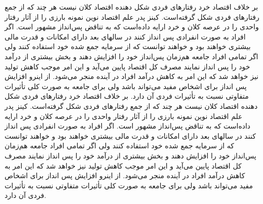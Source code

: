 \documentclass{book}
\begin{document}
بر خلاف اقتصاد خرد رفتارهای فردی شکل دهنده اقتصاد کلان نیست هر چند که از جمع رفتارهای فردی شکل گرفته‌است. کینز پدر علم اقتصاد نوین نمونه بارزی را از آثار رفتار واحدی را در عرصه کلان و خرد ارایه داده‌است که به تناقض پس‌انداز مشهور است. اگر افراد به صورت انفرادی پس انداز کنند در سالهای بعد دارای امکانات و قدرت مالی بیشتری خواهند بود و خواهند توانست که از سرمایه جمع شده خود استفاده کنند ولی اگر تمامی افراد جامعه هم‌زمان پس‌انداز خود را افزایش دهند و بخش بیشتری از درآمد خود را پس انداز نمایند مصرف کل اقتصاد پایین می‌آید و این امر موجب کاهش تولید نیز خواهد شد که این امر به کاهش درآمد افراد در آینده منجر می‌شود. از اینرو افزایش پس انداز برای اشخاص مفید می‌تواند باشد ولی برای جامعه به صورت کلی تأثیرات متفاوتی نسبت به تأثیرات فردی آن دارد.
\newpage
بر خلاف اقتصاد خرد رفتارهای فردی شکل دهنده اقتصاد کلان نیست هر چند که از جمع رفتارهای فردی شکل گرفته‌است. کینز پدر علم اقتصاد نوین نمونه بارزی را از آثار رفتار واحدی را در عرصه کلان و خرد ارایه داده‌است که به تناقض پس‌انداز مشهور است. اگر افراد به صورت انفرادی پس انداز کنند در سالهای بعد دارای امکانات و قدرت مالی بیشتری خواهند بود و خواهند توانست که از سرمایه جمع شده خود استفاده کنند ولی اگر تمامی افراد جامعه هم‌زمان پس‌انداز خود را افزایش دهند و بخش بیشتری از درآمد خود را پس انداز نمایند مصرف کل اقتصاد پایین می‌آید و این امر موجب کاهش تولید نیز خواهد شد که این امر به کاهش درآمد افراد در آینده منجر می‌شود. از اینرو افزایش پس انداز برای اشخاص مفید می‌تواند باشد ولی برای جامعه به صورت کلی تأثیرات متفاوتی نسبت به تأثیرات فردی آن دارد.
\end{document}
